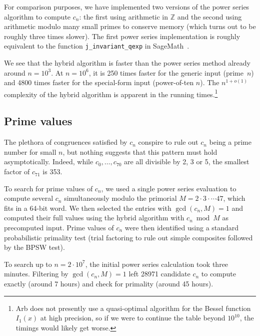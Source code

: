 \documentclass{amsart}
\theoremstyle{definition}
\theoremstyle{remark}
\begin{document}
For comparison purposes, we have implemented two versions of
the power series algorithm to compute $c_n$: the first
using arithmetic in $\mathbb{Z}$ and the second
using arithmetic modulo many small primes to conserve memory
(which turns out to be roughly three times slower).
The first power series implementation
is roughly equivalent to the function \texttt{j\_invariant\_qexp}
in SageMath~\cite{Sag2020}.

We see that the hybrid algorithm is faster
than the power series method already around $n = 10^3$.
At $n = 10^6$, it is 250 times faster for the generic input
(prime~$n$) and 4800 times faster
for the special-form input (power-of-ten $n$).
The $n^{1+o(1)}$ complexity of the hybrid
algorithm is apparent in the running times.\footnote{Arb does not presently
use a quasi-optimal algorithm for the Bessel function $I_1(x)$ at high precision,
so if we were to continue the table beyond $10^{10}$,
the timings would likely get worse.}

\subsection{Prime values}

The plethora of congruences satisfied by $c_n$
conspire to rule out $c_n$ being a prime number for small $n$,
but nothing suggests that this pattern must hold
asymptotically.
Indeed, while $c_0,\ldots,c_{70}$ are all
divisible by 2, 3 or 5, the smallest factor of $c_{71}$ is 353.

To search for prime values of $c_n$, we used a single power series
evaluation
to compute several $c_n$ simultaneously modulo the primorial
$M = 2 \cdot 3 \cdot \cdots 47$, which fits in a 64-bit word.
We then selected the entries with $\gcd(c_n, M) = 1$
and computed their full values 
using the hybrid algorithm with $c_n \bmod M$ as precomputed input.
Prime values of $c_n$ were then identified using a standard probabilistic
primality test (trial factoring to rule out simple composites
followed by the BPSW test).

To search up to $n = 2 \cdot 10^7$, the initial power series
calculation took three minutes. Filtering by $\gcd(c_n, M) = 1$
left 28971 candidate $c_n$ to compute exactly (around 7 hours) and
check for primality (around 45 hours).
\end{document}
